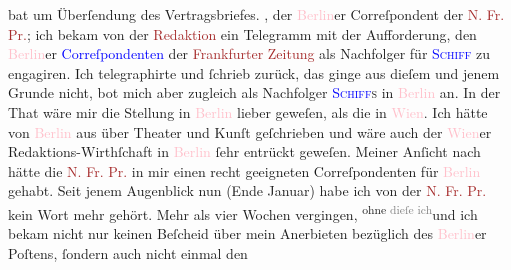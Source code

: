                bat um Überſendung des Vertragsbriefes. \label{K_L02868-5v}\label{K_L02868-5h}, der \textcolor{pink}{Berlin}{}\ledrightnote{\textcolor{pink}{Berlin}}er Correſpondent der \textcolor{brown}{N.
                  Fr. Pr.}{}\ledrightnote{\textcolor{brown}{Neue Freie Presse}}; ich bekam von der \textcolor{brown}{Redaktion}{} ein Telegramm mit der Aufforderung, den \textcolor{pink}{Berlin}{}\ledrightnote{\textcolor{pink}{Berlin}}er \textcolor{blue}{Correſpondenten}{} der \textcolor{brown}{Frankfurter Zeitung}{}\ledrightnote{\textcolor{brown}{Frankfurter Zeitung}}{ } als Nachfolger für \textsc{\textcolor{blue}{Schiff}{}\ledrightnote{\textcolor{blue}{Emil Schiff}}} zu engagiren. {\pb}Ich telegraphirte \introOben{}und ſchrieb\introOben{} zurück, das ginge aus dieſem und jenem Grunde
               nicht, bot mich aber zugleich als Nachfolger \textsc{\textcolor{blue}{Schiff}{}\ledrightnote{\textcolor{blue}{Emil Schiff}}s} in \textcolor{pink}{Berlin}{}\ledrightnote{\textcolor{pink}{Berlin}} an. In der That wäre mir die Stellung in \textcolor{pink}{Berlin}{}\ledrightnote{\textcolor{pink}{Berlin}} lieber geweſen,  als die in \textcolor{pink}{Wien}{}\ledrightnote{\textcolor{pink}{Wien}}. Ich hätte von
                  \textcolor{pink}{Berlin}{}\ledrightnote{\textcolor{pink}{Berlin}} aus über Theater und Kunſt geſchrieben
               und wäre auch der \textcolor{pink}{Wien}{}\ledrightnote{\textcolor{pink}{Wien}}er Redaktions-Wirthſchaft in
                  \textcolor{pink}{Berlin}{}\ledrightnote{\textcolor{pink}{Berlin}} ſehr  entrückt geweſen. Meiner Anſicht nach hätte
               die \textcolor{brown}{N. Fr. Pr.}{}\ledrightnote{\textcolor{brown}{Neue Freie Presse}} in mir einen recht geeigneten
               Correſpondenten für \textcolor{pink}{Berlin}{}\ledrightnote{\textcolor{pink}{Berlin}} gehabt. Seit jenem
               Augenblick nun (Ende Januar) habe ich  von der \textcolor{brown}{N. Fr.
                  Pr.}{}\ledrightnote{\textcolor{brown}{Neue Freie Presse}} kein Wort mehr gehört. Mehr als vier Wochen vergingen, \substVorne{}\textsuperscript{ohne{ }\textcolor{gray}{dieſe ich}}{\allowbreak}\substDazwischen{}und ich bekam\substHinten{} nicht nur keinen Beſcheid über mein Anerbieten bezüglich des \textcolor{pink}{Berlin}{}\ledrightnote{\textcolor{pink}{Berlin}}er Poſtens, ſondern auch nicht einmal den
